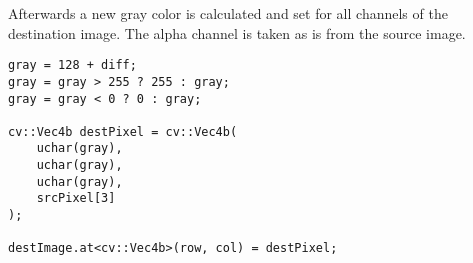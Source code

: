 Afterwards a new gray color is calculated and set for all channels of the destination image. The alpha channel is taken as is from the source image.

\begin{listing}[H]
\begin{verbatim}
gray = 128 + diff;
gray = gray > 255 ? 255 : gray;
gray = gray < 0 ? 0 : gray;

cv::Vec4b destPixel = cv::Vec4b(
    uchar(gray),
    uchar(gray),
    uchar(gray),
    srcPixel[3]
);

destImage.at<cv::Vec4b>(row, col) = destPixel;
\end{verbatim}
\label{listing:emboss2}
\end{listing}